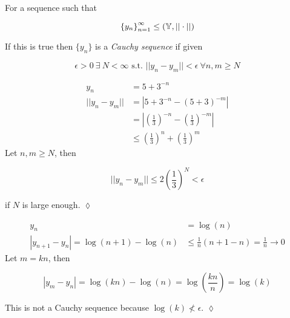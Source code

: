 \begin{definition}
For a sequence such that

\begin{equation*}
{\{y_n\}}_{n=1}^\infty \leq (\mathbb{Y},||\cdot||)
\end{equation*}

If this is true then $\{y_n\}$ is a \textit{Cauchy sequence} if given

\begin{equation*}
\epsilon>0~\exists~N<\infty \text{~s.t.~} ||y_n-y_m||<\epsilon~\forall n,m\geq N
\end{equation*}

\end{definition}

\begin{example}
\begin{align*}
y_n &= 5+3^{-n} \\
||y_n-y_m|| &= |5+3^{-n}-{(5+3)}^{-m}| \\
&= \left|{\left(\frac{1}{3}\right)}^{-n} - {\left(\frac{1}{3}\right)}^{-m}\right| \\
&\leq {\left(\frac{1}{3}\right)}^n + {\left(\frac{1}{3}\right)}^m
\end{align*}
Let $n,m\geq N$, then

\begin{equation*}
||y_n-y_m|| \leq 2{\left(\frac{1}{3}\right)}^N < \epsilon
\end{equation*}

if $N$ is large enough.
$\lozenge$
\end{example}

\begin{example}
\begin{align*}
y_n &= \log(n) \\
|y_{n+1}-y_n| = \log(n+1)-\log(n) &\leq \frac{1}{n}(n+1-n) = \frac{1}{n}\to 0
\end{align*}
Let $m=kn$, then

\begin{equation*}
|y_m-y_n| = \log(kn)-\log(n) = \log\left(\frac{kn}{n}\right) = \log(k)
\end{equation*}

This is not a Cauchy sequence because $\log(k)\nless\epsilon$.
$\lozenge$
\end{example}

